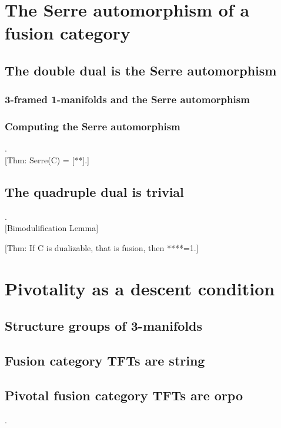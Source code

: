 \documentclass{amsart}
\begin{document}
\section{The Serre automorphism of a fusion category}

\subsection{The double dual is the Serre automorphism}

\subsubsection{3-framed 1-manifolds and the Serre automorphism}

\subsubsection{Computing the Serre automorphism} .\\

	[Thm: Serre(C) = [**].]

\subsection{The quadruple dual is trivial} .\\

	[Bimodulification Lemma]
	
	[Thm: If C is dualizable, that is fusion, then ****=1.]

\section{Pivotality as a descent condition}

\subsection{Structure groups of 3-manifolds}

\subsection{Fusion category TFTs are string}

\subsection{Pivotal fusion category TFTs are orpo} .\\
\end{document}
